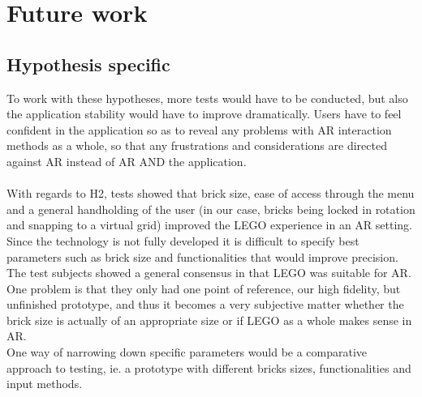 
\section{Future work}

\subsection{Hypothesis specific}
To work with these hypotheses, more tests would have to be conducted, but also the application stability would have to improve dramatically. Users have to feel confident in the application so as to reveal any problems with AR interaction methods as a whole, so that any frustrations and considerations are directed against AR instead of AR AND the application.\\
\\
With regards to H2, tests showed that brick size, ease of access through the menu and a general handholding of the user (in our case, bricks being locked in rotation and snapping to a virtual grid) improved the LEGO experience in an AR setting. Since the technology is not fully developed it is difficult to specify best parameters such as brick size and functionalities that would improve precision. The test subjects showed a general consensus in that LEGO was suitable for AR. One problem is that they only had one point of reference, our high fidelity, but unfinished prototype, and thus it becomes a very subjective matter whether the brick size is actually of an appropriate size or if LEGO as a whole makes sense in AR.\\
One way of narrowing down specific parameters would be a comparative approach to testing, ie. a prototype with different bricks sizes, functionalities and input methods. 

